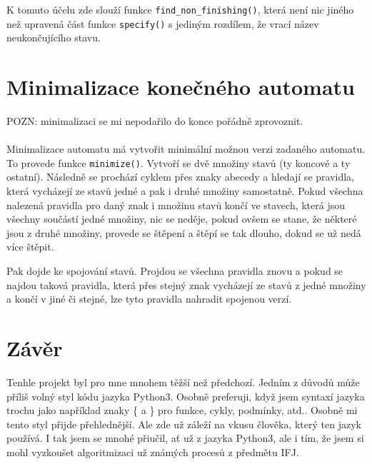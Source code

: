 \documentclass[a4paper, 11pt]{article}
\begin{document}
K tomuto účelu zde slouží funkce \texttt{find\_non\_finishing()}, která není nic jiného než upravená část funkce \texttt{specify()} s jediným rozdílem, že vrací název neukončujícího stavu.

\section{Minimalizace konečného automatu}

POZN: minimalizaci se mi nepodařilo do konce pořádně zprovoznit.
\\ \\
Minimalizace automatu má vytvořit minimální možnou verzi zadaného automatu. To provede funkce \texttt{minimize()}. Vytvoří se dvě množiny stavů (ty koncové a ty ostatní). Následně se prochází cyklem přes znaky abecedy a hledají se pravidla, která vycházejí ze stavů jedné a pak i druhé množiny samostatně. Pokud všechna nalezená pravidla pro daný znak i množinu stavů končí ve stavech, která jsou všechny součástí jedné množiny, nic se neděje, pokud ovšem se stane, že některé jsou z druhé množiny, provede se štěpení a štěpí se tak dlouho, dokud se už nedá více štěpit.

Pak dojde ke spojování stavů. Projdou se všechna pravidla znovu a pokud se najdou taková pravidla, která přes stejný znak vycházejí ze stavů z jedné množiny a končí v jiné či stejné, lze tyto pravidla nahradit spojenou verzí.

\section*{Závěr}

Tenhle projekt byl pro mne mnohem těžší než předchozí. Jedním z důvodů může příliš volný styl kódu jazyka Python3. Osobně preferuji, když jsem syntaxí jazyka trochu  jako například znaky \{ a \} pro funkce, cykly, podmínky, atd.. Osobně mi tento styl přijde přehlednější. Ale zde už záleží na vkusu člověka, který ten jazyk používá. I tak jsem se mnohé přiučil, ať už z jazyka Python3, ale i tím, že jsem si mohl vyzkoušet algoritmizaci už známých procesů z předmětu IFJ.
\end{document}
